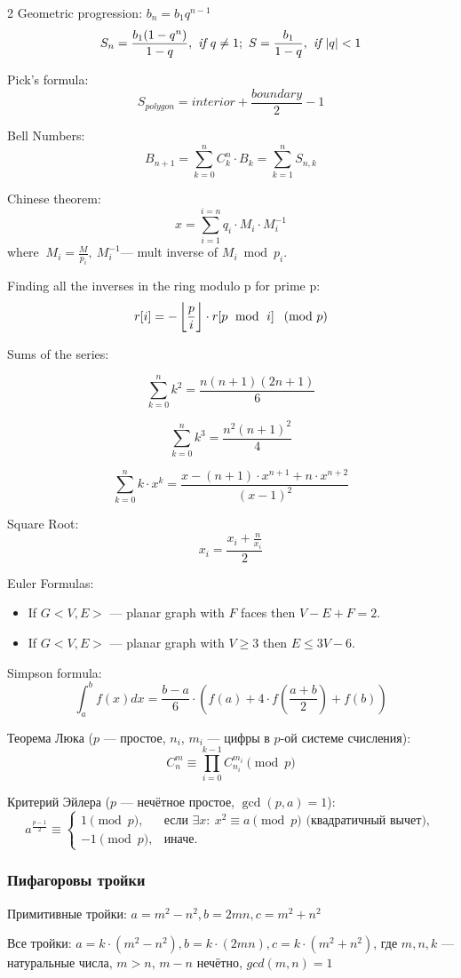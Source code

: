 \begin{minipage}{0.48\textwidth}
	\begin{multicols}{2}
	Geometric progression: $b_n = b_1 q^{n - 1}$
	$$
	S_n = \frac{b_1 (1 - q^n)}{1 - q},\textit { if } q \neq 1;\ S = \frac{b_1}{1 - q},\textit { if } \abs{q} < 1
	$$

	Pick's formula: 
	$$S_{polygon} = interior + \frac{boundary}{2} - 1$$

	Bell Numbers:
	$$B_{n+1} = \sum_{k=0}^{n}{C_k^n \cdot B_k} = \sum_{k=1}^{n}{S_{n,k}}$$
	
	Chinese theorem:
	$$x = \sum_{i=1}^{i=n}{q_i \cdot M_i \cdot M^{-1}_i}$$
	where $\ M_i = \frac{M}{p_i},\ M^{-1}_i$--- mult inverse of $M_i \bmod p_i$.

	Finding all the inverses in the ring modulo p for prime p:
	$$r[i] = - \floor {\frac{p}{i}} \cdot r[p\ \bmod\ i]\ \pmod p$$

	Sums of the series: 

	$$\sum_{k=0}^{n} k^2 = {\frac{n(n+1)(2n+1)}{6}}$$

	$$\sum_{k=0}^{n} k^3 = {\frac{n^2(n+1)^2}{4}}$$

	$$\sum_{k=0}^{n} k\cdot x^k = \frac{x - (n+1) \cdot x^{n+1} + n \cdot x^{n+2}}{(x-1)^2}$$

	Square Root: $$x_i = \frac{x_i + \frac{n}{x_i}}{2}$$

	Euler Formulas:
	\begin {itemize}
		\item If $G <V, E>$ --- planar graph with $F$ faces then $V - E + F = 2$.
		\item If $G<V, E>$ --- planar graph with $V \ge 3$ then $E \le 3V-6$.
	\end {itemize}
	\end{multicols}
	Simpson formula: 
	$$\int_a^b f(x) dx = \frac{b-a}{6} \cdot \left (f(a) + 4 \cdot f \left (\frac{a+b}{2} \right) + f(b) \right )$$

	Теорема Люка ($p$ --- простое, $n_i$, $m_i$ --- цифры в $p$-ой системе счисления):
	$$C_{n}^{m}\equiv \prod_{i=0}^{k-1}C_{n_i}^{m_i} \pmod p$$

	Критерий Эйлера ($p$ --- нечётное простое, $\gcd(p, a) = 1$):
	$$
	a^{\frac{p-1}{2}} \equiv
	\begin{cases}
	1 \pmod p, & \text{если } \exists x:\ x^2 \equiv a \pmod p \text{ (квадратичный вычет)},\\
	-1 \pmod p, & \text{иначе}.
	\end{cases}
	$$

\end{minipage}

\subsubsection{Пифагоровы тройки}

\begin{minipage}{0.48\textwidth}
    Примитивные тройки: $a=m^{2}-n^{2}, b=2mn, c=m^{2}+n^{2}$

    Все тройки: $a=k\cdot (m^{2}-n^{2}), b=k\cdot (2mn), c=k\cdot (m^{2}+n^{2})$, где $m, n, k$ — натуральные числа, $m > n$, $m - n$ нечётно, $gcd(m, n) = 1$
\end{minipage}